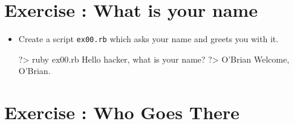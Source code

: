 \documentclass{42-en}
\begin{document}
\chapter{Exercise \exercicenumber: What is your name}

\exnumber{\exercicenumber}

\makeheaderfiles


\begin{itemize}

\item Create a script \texttt{ex00.rb} which asks your name and greets you with it.

\begin{42console}
	?> ruby ex00.rb
	Hello hacker, what is your name?
	?> O'Brian
	Welcome, O'Brian.
\end{42console}

\end{itemize}



\chapter{Exercise \exercicenumber: Who Goes There}

\exnumber{\exercicenumber}

\makeheaderfiles
\end{document}
